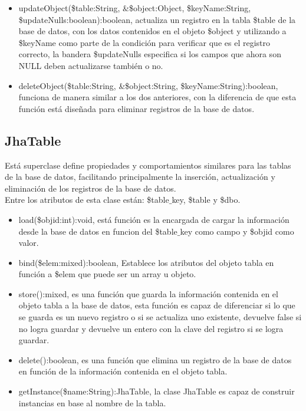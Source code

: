 \begin{itemize}
\item \textsf{updateObject(\$table:String, \&\$object:Object, \$keyName:String, \$updateNulls:boolean):boolean}, actualiza un registro en la tabla \textsf{\$table} de la base de datos, con los datos contenidos en el objeto \textsf{\$object} y utilizando a \textsf{\$keyName} como parte de la condici\'on para verificar que es el registro correcto, la bandera \textsf{\$updateNulls} especifica si los campos que ahora son NULL deben actualizarse tambi\'en o no.
\item \textsf{deleteObject(\$table:String, \&\$object:String, \$keyName:String):boolean}, funciona de manera similar a los dos anteriores, con la diferencia de que esta funci\'on est\'a dise\~nada para eliminar registros de la base de datos.
\end{itemize}

\subsection{JhaTable}
Est\'a superclase define propiedades y comportamientos similares para las tablas de la base de datos, facilitando principalmente la inserci\'on, actualizaci\'on y eliminaci\'on de los registros de la base de datos.\\
Entre los atributos de esta clase est\'an: \textsf{\$table$\_$key}, \textsf{\$table} y \textsf{\$dbo}.
\begin{itemize}
\item \textsf{load(\$objid:int):void}, est\'a funci\'on es la encargada de cargar la informaci\'on desde la base de datos en funcion del \textsf{\$table$\_$key} como campo y \textsf{\$objid} como valor.
\item \textsf{bind(\$elem:mixed):boolean}, Establece los atributos del objeto tabla en funci\'on a \textsf{\$elem} que puede ser un array u objeto.
\item \textsf{store():mixed}, es una funci\'on que guarda la informaci\'on contenida en el objeto tabla a la base de datos, esta funci\'on es capaz de diferenciar si lo que se guarda es un nuevo registro o si se actualiza uno existente, devuelve false si no logra guardar y devuelve un entero con la clave del registro si se logra guardar.
\item \textsf{delete():boolean}, es una funci\'on que elimina un registro de la base de datos en funci\'on de la informaci\'on contenida en el objeto tabla.
\item \textsf{getInstance(\$name:String):JhaTable}, la clase JhaTable es capaz de construir instancias en base al nombre de la tabla.
\end{itemize}

